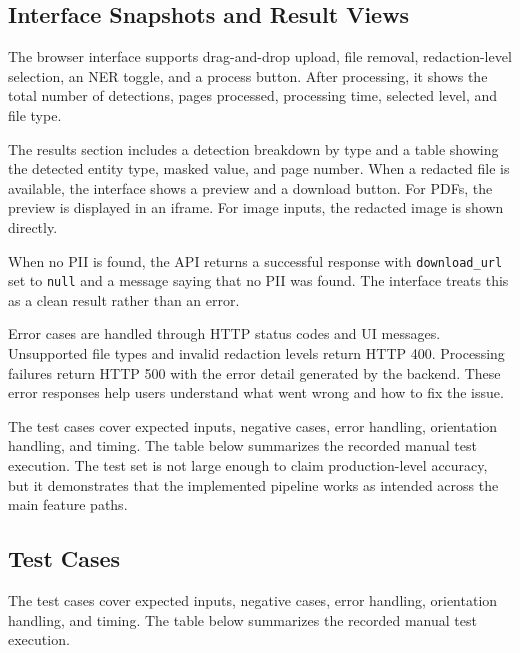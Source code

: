 \subsection{Interface Snapshots and Result Views}

The browser interface supports drag-and-drop upload, file removal, redaction-level selection, an NER toggle, and a process button. After processing, it shows the total number of detections, pages processed, processing time, selected level, and file type.

The results section includes a detection breakdown by type and a table showing the detected entity type, masked value, and page number. When a redacted file is available, the interface shows a preview and a download button. For PDFs, the preview is displayed in an iframe. For image inputs, the redacted image is shown directly.

When no PII is found, the API returns a successful response with \texttt{download\_url} set to \texttt{null} and a message saying that no PII was found. The interface treats this as a clean result rather than an error.

Error cases are handled through HTTP status codes and UI messages. Unsupported file types and invalid redaction levels return HTTP 400. Processing failures return HTTP 500 with the error detail generated by the backend. These error responses help users understand what went wrong and how to fix the issue.

\bigskip

The test cases cover expected inputs, negative cases, error handling, orientation handling, and timing. The table below summarizes the recorded manual test execution. The test set is not large enough to claim production-level accuracy, but it demonstrates that the implemented pipeline works as intended across the main feature paths.

\subsection{Test Cases}

The test cases cover expected inputs, negative cases, error handling, orientation handling, and timing. The table below summarizes the recorded manual test execution.


